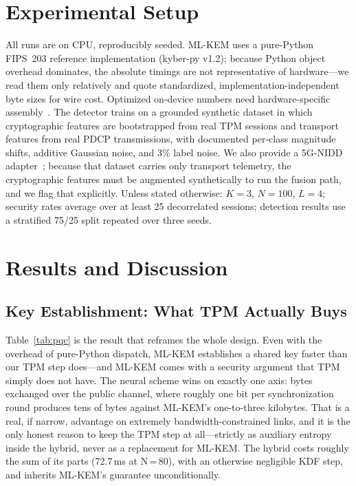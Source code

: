 \documentclass[conference]{IEEEtran}
\begin{document}
\section{Experimental Setup}

All runs are on CPU, reproducibly seeded. ML-KEM uses a pure-Python FIPS~203
reference implementation (kyber-py v1.2); because Python object overhead dominates,
the absolute timings are not representative of hardware---we read them only
relatively and quote standardized, implementation-independent byte sizes for wire
cost. Optimized on-device numbers need hardware-specific
assembly~\cite{kannwischer2019pqm4}. The detector trains on a grounded synthetic
dataset in which cryptographic features are bootstrapped from real TPM sessions and
transport features from real PDCP transmissions, with documented per-class magnitude
shifts, additive Gaussian noise, and 3\% label noise. We also provide a 5G-NIDD
adapter~\cite{samarakoon2022nidd}; because that dataset carries only transport
telemetry, the cryptographic features must be augmented synthetically to run the
fusion path, and we flag that explicitly. Unless stated otherwise: $K{=}3$, $N{=}100$,
$L{=}4$; security rates average over at least 25 decorrelated sessions; detection
results use a stratified 75/25 split repeated over three seeds.






\section{Results and Discussion}

\subsection{Key Establishment: What TPM Actually Buys}

Table~\ref{tab:pqc} is the result that reframes the whole design. Even with the
overhead of pure-Python dispatch, ML-KEM establishes a shared key faster than our
TPM step does---and ML-KEM comes with a security argument that TPM simply does not
have. The neural scheme wins on exactly one axis: bytes exchanged over the public
channel, where roughly one bit per synchronization round produces tens of bytes
against ML-KEM's one-to-three kilobytes. That is a real, if narrow, advantage on
extremely bandwidth-constrained links, and it is the only honest reason to keep the
TPM step at all---strictly as auxiliary entropy inside the hybrid, never as a
replacement for ML-KEM. The hybrid costs roughly the sum of its parts (72.7\,ms at
N\,=\,80), with an otherwise negligible KDF step, and inherits ML-KEM's guarantee
unconditionally.
\end{document}
